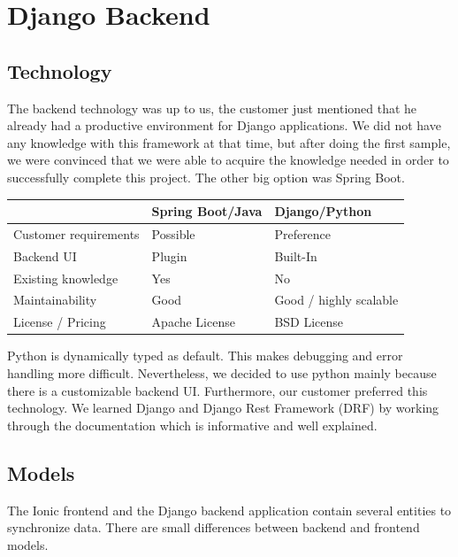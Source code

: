 \documentclass[11pt]{article} %
\begin{document}
\section{Django Backend}
\subsection{Technology}
The backend technology was up to us, the customer just mentioned that he already had a productive environment for Django applications. We did not have any knowledge with this framework at that time, but after doing the first sample, we were convinced that we were able to acquire the knowledge needed in order to successfully complete this project. The other big option was Spring Boot.\\

\begin{tabulary}{\linewidth}{LLL}
    \hline
    &Spring Boot/Java      & Django/Python                         \\
    \hline                            
Customer requirements & Possible       & Preference             \\
Backend UI            & Plugin         & Built-In               \\
Existing knowledge    & Yes            & No                     \\
Maintainability       & Good           & Good / highly scalable \\
License / Pricing     & Apache License & BSD License      \\     
    \hline
 \end{tabulary} 
 
 \vspace{0.5cm}

 
Python is dynamically typed as default. This makes debugging and error handling more difficult. Nevertheless, we decided to use python mainly because there is a customizable backend UI. Furthermore, our customer preferred this technology. We learned Django and Django Rest Framework (DRF) by working through the documentation\cite{django} which is informative and well explained.

\subsection{Models}
The Ionic frontend and the Django backend application contain several entities to synchronize data. There are small differences between backend and frontend models.\\
\end{document}
